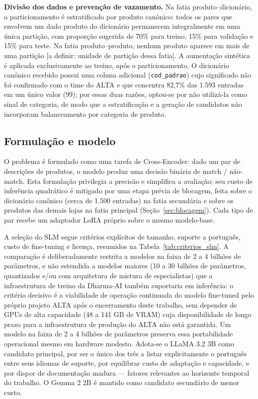 \documentclass[
    article,
    12pt,
    oneside,
    a4paper,
    english,
    brazilian
    ]{abntex2}
\numberwithin{equation}{section}
\begin{document}
\textbf{Divisão dos dados e prevenção de vazamento.} Na fatia produto--dicionário, o particionamento é estratificado por produto canônico: todos os pares que envolvem um dado produto do dicionário permanecem integralmente em uma única partição, com proporção sugerida de 70\% para treino, 15\% para validação e 15\% para teste. Na fatia produto--produto, nenhum produto aparece em mais de uma partição [a definir: unidade de partição dessa fatia]. A aumentação sintética é aplicada exclusivamente ao treino, após o particionamento. O dicionário canônico recebido possui uma coluna adicional (\texttt{cod\_padrao}) cujo significado não foi confirmado com o time do ALTA e que concentra 82,7\% das 1.593 entradas em um único valor (99); por essas duas razões, optou-se por não utilizá-la como sinal de categoria, de modo que a estratificação e a geração de candidatos não incorporam balanceamento por categoria de produto.

\subsection{Formulação e modelo}
\label{sec:formulacao-modelo}

O problema é formulado como uma tarefa de Cross-Encoder: dado um par de descrições de produtos, o modelo produz uma decisão binária de match / não-match. Esta formulação privilegia a precisão e simplifica a avaliação; seu custo de inferência quadrático é mitigado por uma etapa prévia de blocagem, feita sobre o dicionário canônico (cerca de 1.500 entradas) na fatia secundária e sobre os produtos das demais lojas na fatia principal (Seção~\ref{sec:blocagem}). Cada tipo de par recebe um adaptador LoRA próprio sobre o mesmo modelo-base.

A seleção do SLM segue critérios explícitos de tamanho, suporte a português, custo de fine-tuning e licença, resumidos na Tabela~\ref{tab:criterios_slm}. A comparação é deliberadamente restrita a modelos na faixa de 2 a 4 bilhões de parâmetros, e não estendida a modelos maiores (10 a 30 bilhões de parâmetros, quantizados e/ou com arquitetura de mistura de especialistas) que a infraestrutura de treino da Dharma-AI também suportaria em inferência: o critério decisivo é a viabilidade de operação continuada do modelo fine-tuned pelo próprio projeto ALTA após o encerramento deste trabalho, sem depender de GPUs de alta capacidade (48 a 141 GB de VRAM) cuja disponibilidade de longo prazo para a infraestrutura de produção do ALTA não está garantida. Um modelo na faixa de 2 a 4 bilhões de parâmetros preserva essa portabilidade operacional mesmo em hardware modesto. Adota-se o LLaMA 3.2 3B como candidato principal, por ser o único dos três a listar explicitamente o português entre seus idiomas de suporte, por equilibrar custo de adaptação e capacidade, e por dispor de documentação madura --- fatores relevantes ao horizonte temporal do trabalho. O Gemma 2 2B é mantido como candidato secundário de menor custo.
\end{document}
